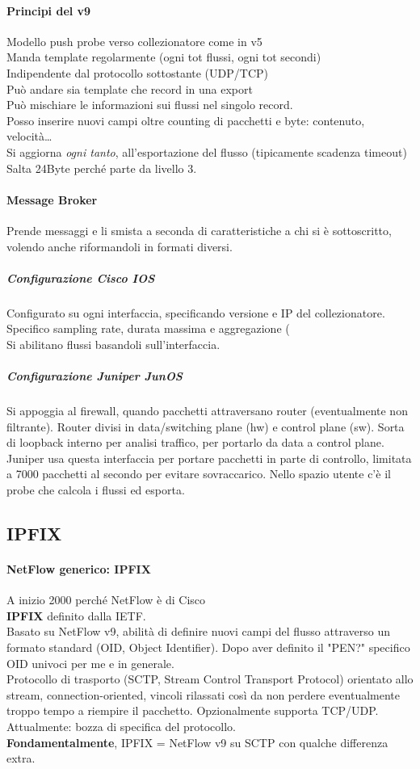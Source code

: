 \documentclass[10pt]{book}
\begin{document}
\paragraph{Principi del v9} Modello push probe verso collezionatore come in v5\\
Manda template regolarmente (ogni tot flussi, ogni tot secondi)\\
Indipendente dal protocollo sottostante (UDP/TCP)\\
Può andare sia template che record in una export\\
Può mischiare le informazioni sui flussi nel singolo record.\\
Posso inserire nuovi campi oltre counting di pacchetti e byte: contenuto, velocità\ldots\\
Si aggiorna \textit{ogni tanto}, all'esportazione del flusso (tipicamente scadenza timeout)\\
Salta 24Byte perché parte da livello 3.
\paragraph{Message Broker} Prende messaggi e li smista a seconda di caratteristiche a chi si è sottoscritto, volendo anche riformandoli in formati diversi.
\subparagraph{Configurazione Cisco IOS} Configurato su ogni interfaccia, specificando versione e IP del collezionatore. Specifico sampling rate, durata massima e aggregazione (\\
Si abilitano flussi basandoli sull'interfaccia.
\subparagraph{Configurazione Juniper JunOS} Si appoggia al firewall, quando pacchetti attraversano router (eventualmente non filtrante). Router divisi in data/switching plane (hw) e control plane (sw). Sorta di loopback interno per analisi traffico, per portarlo da data a control plane. Juniper usa questa interfaccia per portare pacchetti in parte di controllo, limitata a 7000 pacchetti al secondo per evitare sovraccarico. Nello spazio utente c'è il probe che calcola i flussi ed esporta.
\subsection{IPFIX}
\paragraph{NetFlow generico: IPFIX} A inizio 2000 perché NetFlow è di Cisco\\
\textbf{IPFIX} definito dalla IETF.\\
Basato su NetFlow v9, abilità di definire nuovi campi del flusso attraverso un formato standard (OID, Object Identifier). Dopo aver definito il "PEN?" specifico OID univoci per me e in generale.\\
Protocollo di trasporto (SCTP, Stream Control Transport Protocol) orientato allo stream, connection-oriented, vincoli rilassati così da non perdere eventualmente troppo tempo a riempire il pacchetto. Opzionalmente supporta TCP/UDP.\\
Attualmente: bozza di specifica del protocollo.\\
\textbf{Fondamentalmente}, IPFIX = NetFlow v9 su SCTP con qualche differenza extra.
\end{document}
